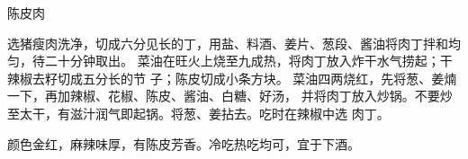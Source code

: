 \begin{recipe}{陈皮肉}

\ingredients


\cooking

\step 选猪瘦肉洗净，切成六分见长的丁，用盐、料酒、姜片、葱段、酱油将肉丁拌和均
匀，待二十分钟取出。
\step 菜油在旺火上烧至九成热，将肉丁放入炸干水气捞起；干辣椒去籽切成五分长的节
子；陈皮切成小条方块。
\step 菜油四两烧红，先将葱、姜煵一下，再加辣椒、花椒、陈皮、酱油、白糖、好汤，
并将肉丁放入炒锅。不要炒至太干，有滋汁润气即起锅。将葱、姜拈去。吃时在辣椒中选
肉丁。

\notes

颜色金红，麻辣味厚，有陈皮芳香。冷吃热吃均可，宜于下酒。

\end{recipe}

